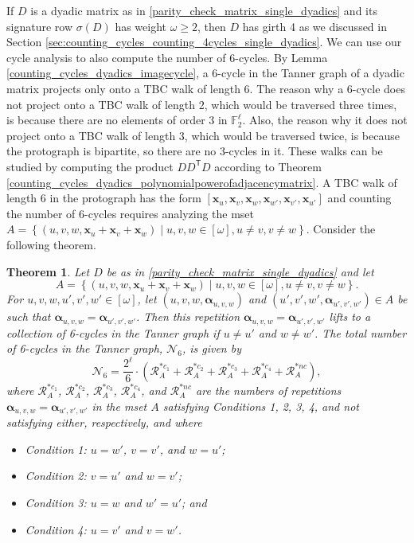 \documentclass[11pt]{article}
\newtheorem{theorem}[lemma]{Theorem}
\theoremstyle{plain}
\theoremstyle{plain}
\theoremstyle{definition}
\numberwithin{theo}{section}
\newcommand{\bx}{{\mathbf x}}
\newcommand{\balpha}{{\boldsymbol \alpha}}
\newcounter{alp}
\begin{document}
If $D$ is a dyadic matrix as in \eqref{parity_check_matrix_single_dyadics} and its signature row $\sigma(D)$ has weight $\omega\geq2$, then $D$ has girth 4 as we discussed in Section \ref{sec:counting_cycles_counting_4cycles_single_dyadics}. We can use our cycle analysis to also compute the number of 6-cycles. By Lemma \ref{counting_cycles_dyadics_imagecycle}, a 6-cycle in the Tanner graph of a dyadic matrix projects only onto a TBC walk of length 6. The reason why a 6-cycle does not project onto a TBC walk of length 2, which would be traversed three times, is because there are no elements of order 3 in $\mathbb{F}_2^\ell$. Also, the reason why it does not project onto a TBC walk of length 3, which would be traversed twice, is because the protograph is bipartite, so there are no 3-cycles in it. These walks can be studied by computing the product $DD^\mathsf{T}D$ according to Theorem \ref{counting_cycles_dyadics_polynomialpowerofadjacencymatrix}. A TBC walk of length 6 in the protograph has the form $[\bx_{u},\bx_{v},\bx_{w},\bx_{w'},\bx_{v'},\bx_{u'}]$ and counting the number of 6-cycles requires analyzing the mset $A=\left\{\left(u,v,w,\bx_{u}+\bx_{v}+\bx_{w}\right)\mid u,v,w\in[\omega],u\neq v,v\neq w\right\}$. Consider the following theorem.
\begin{theorem}
\label{counting_cycles_thm_6cycles_ncxnv_single_dyadics}
Let $D$ be as in \eqref{parity_check_matrix_single_dyadics} and let
\begin{equation*}
A=\left\{\left(u,v,w,\bx_{u}+\bx_{v}+\bx_{w}\right)\mid u,v,w\in[\omega],u\neq v,v\neq w\right\}.
\end{equation*}
\noindent For $u,v,w,u',v',w'\in[\omega]$, let $(u,v,w,\balpha_{u,v,w})$ and $(u',v',w',\balpha_{u',v',w'}) \in A$ be such that $\balpha_{u,v,w}=\balpha_{u',v',w'}$.  
Then this repetition $\balpha_{u,v,w}=\balpha_{u',v',w'}$ lifts to a collection of 6-cycles in the Tanner graph if $u\neq u'$ and $w\neq w'$. The total number of 6-cycles in the Tanner graph, $\mathcal{N}_6$, is given by
\begin{equation}
\label{counting_cycles_formula_num6cycles_ncxnv_single_dyadics}
\mathcal{N}_6=\frac{2^\ell}{6}\cdot\left(\mathcal{R}_{A}^{*c_1}+\mathcal{R}_{A}^{*c_2}+\mathcal{R}_{A}^{*c_3}+\mathcal{R}_{A}^{*c_4}+\mathcal{R}_{A}^{*nc}\right),
\end{equation}
where $\mathcal{R}_{A}^{*c_1}$, $\mathcal{R}_{A}^{*c_2}$, $\mathcal{R}_{A}^{*c_3}$, $\mathcal{R}_{A}^{*c_4}$, and $\mathcal{R}_{A}^{*nc}$ are the numbers of repetitions $\balpha_{u,v,w}=\balpha_{u',v',w'}$ in the mset $A$ satisfying Conditions 1, 2, 3, 4, and not satisfying either, respectively, and where
\begin{itemize}
\item Condition 1: $u=w'$, $v=v'$, and $w=u'$;
\item Condition 2: $v=u'$ and $w=v'$;
\item Condition 3: $u=w$ and $w'=u'$; and
\item Condition 4: $u=v'$ and $v=w'$.
\end{itemize} 
\end{theorem}
\end{document}
